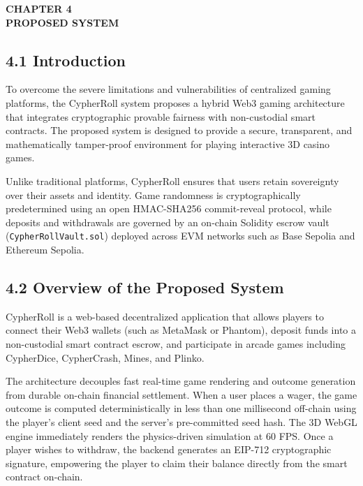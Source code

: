 \vspace*{0.5cm}
\begin{center}
\textbf{CHAPTER 4}\\[0.15cm]
\textbf{PROPOSED SYSTEM}
\end{center}
\label{chap:proposed}
\vspace{0.2cm}

\subsection*{4.1 Introduction}
To overcome the severe limitations and vulnerabilities of centralized gaming platforms, the CypherRoll system proposes a hybrid Web3 gaming architecture that integrates cryptographic provable fairness with non-custodial smart contracts. The proposed system is designed to provide a secure, transparent, and mathematically tamper-proof environment for playing interactive 3D casino games.

Unlike traditional platforms, CypherRoll ensures that users retain sovereignty over their assets and identity. Game randomness is cryptographically predetermined using an open HMAC-SHA256 commit-reveal protocol, while deposits and withdrawals are governed by an on-chain Solidity escrow vault (\texttt{CypherRollVault.sol}) deployed across EVM networks such as Base Sepolia and Ethereum Sepolia.

\subsection*{4.2 Overview of the Proposed System}
CypherRoll is a web-based decentralized application that allows players to connect their Web3 wallets (such as MetaMask or Phantom), deposit funds into a non-custodial smart contract escrow, and participate in arcade games including CypherDice, CypherCrash, Mines, and Plinko.

The architecture decouples fast real-time game rendering and outcome generation from durable on-chain financial settlement. When a user places a wager, the game outcome is computed deterministically in less than one millisecond off-chain using the player's client seed and the server's pre-committed seed hash. The 3D WebGL engine immediately renders the physics-driven simulation at 60 FPS. Once a player wishes to withdraw, the backend generates an EIP-712 cryptographic signature, empowering the player to claim their balance directly from the smart contract on-chain.


